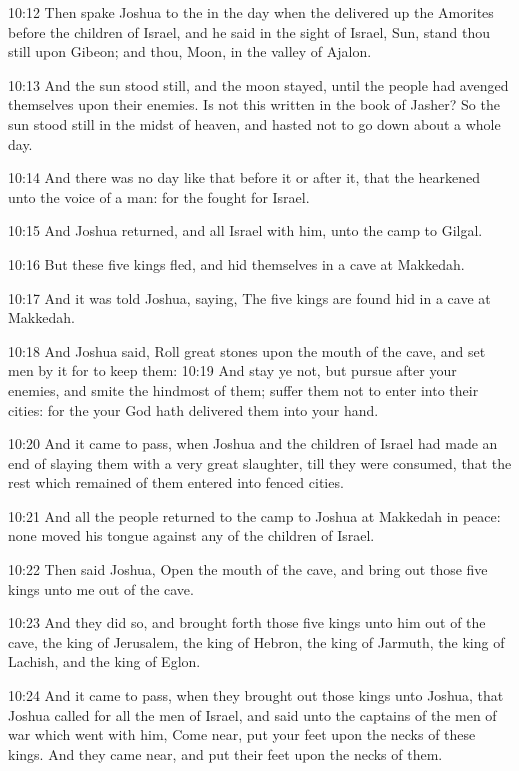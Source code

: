 10:12 Then spake Joshua to the \LORD in the day when the \LORD delivered up the Amorites before the children of Israel, and he said in the sight of Israel, Sun, stand thou still upon Gibeon; and thou, Moon, in the valley of Ajalon.

10:13 And the sun stood still, and the moon stayed, until the people had avenged themselves upon their enemies. Is not this written in the book of Jasher? So the sun stood still in the midst of heaven, and hasted not to go down about a whole day.

10:14 And there was no day like that before it or after it, that the \LORD hearkened unto the voice of a man: for the \LORD fought for Israel.

10:15 And Joshua returned, and all Israel with him, unto the camp to Gilgal.

10:16 But these five kings fled, and hid themselves in a cave at Makkedah.

10:17 And it was told Joshua, saying, The five kings are found hid in a cave at Makkedah.

10:18 And Joshua said, Roll great stones upon the mouth of the cave, and set men by it for to keep them: 10:19 And stay ye not, but pursue after your enemies, and smite the hindmost of them; suffer them not to enter into their cities: for the \LORD your God hath delivered them into your hand.

10:20 And it came to pass, when Joshua and the children of Israel had made an end of slaying them with a very great slaughter, till they were consumed, that the rest which remained of them entered into fenced cities.

10:21 And all the people returned to the camp to Joshua at Makkedah in peace: none moved his tongue against any of the children of Israel.

10:22 Then said Joshua, Open the mouth of the cave, and bring out those five kings unto me out of the cave.

10:23 And they did so, and brought forth those five kings unto him out of the cave, the king of Jerusalem, the king of Hebron, the king of Jarmuth, the king of Lachish, and the king of Eglon.

10:24 And it came to pass, when they brought out those kings unto Joshua, that Joshua called for all the men of Israel, and said unto the captains of the men of war which went with him, Come near, put your feet upon the necks of these kings. And they came near, and put their feet upon the necks of them.

